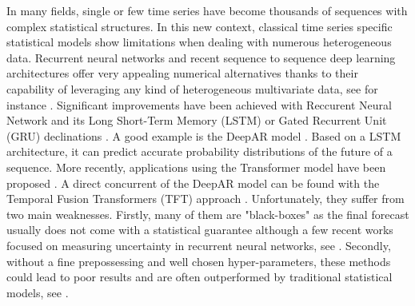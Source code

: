 \documentclass{article} %
\begin{document}

In many fields, single or few time series have become thousands of sequences with complex statistical structures. In this new context, classical time series specific statistical models show limitations when dealing with numerous heterogeneous data. Recurrent neural networks and recent sequence to sequence deep learning architectures offer very appealing numerical alternatives thanks to their capability of leveraging any kind of heterogeneous multivariate data, see for instance \citep{ hochreiter1997long,vaswani2017attention, salinas2020deepar, li2019enhancing, lim2019temporal}. %
Significant improvements have been achieved with Reccurent Neural Network and its Long Short-Term Memory (LSTM) or Gated Recurrent Unit (GRU)  declinations \citep{8614252}. 
A good example is the DeepAR model \citep{salinas2020deepar}. Based on a LSTM architecture, it can predict accurate probability distributions of the future of a sequence. More recently, applications using the Transformer model have been proposed  \citep{li2019enhancing}. A direct concurrent of the DeepAR model can be found with the Temporal Fusion Transformers (TFT) approach \citep{lim2019temporal}.  Unfortunately, they suffer from two main weaknesses. Firstly, many of them are "black-boxes"  as the final forecast usually does not come with a statistical guarantee  although a few recent works focused on measuring uncertainty in recurrent neural networks, see  \cite{martin2020monte}. Secondly, without a fine prepossessing and well chosen hyper-parameters, these methods could lead to poor results and are often outperformed by traditional statistical models, see \cite{makridakis2018m4}.
\end{document}
